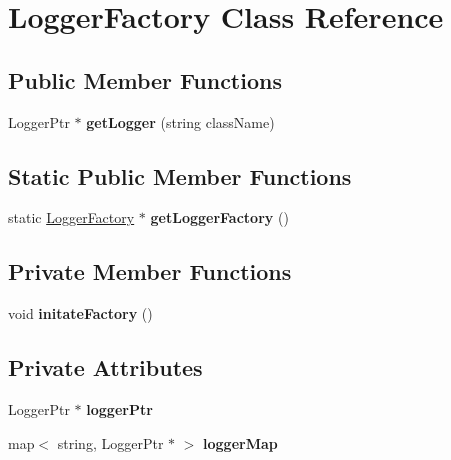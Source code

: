 \hypertarget{classLoggerFactory}{\section{\-Logger\-Factory \-Class \-Reference}
\label{classLoggerFactory}
}
\subsection*{\-Public \-Member \-Functions}
\begin{DoxyCompactItemize}
\item 
\hypertarget{classLoggerFactory_a579a14589f27a5bd908862c299e79251}{\-Logger\-Ptr $\ast$ {\bfseries get\-Logger} (string class\-Name)}\label{classLoggerFactory_a579a14589f27a5bd908862c299e79251}

\end{DoxyCompactItemize}
\subsection*{\-Static \-Public \-Member \-Functions}
\begin{DoxyCompactItemize}
\item 
\hypertarget{classLoggerFactory_ade202cd01c397ab938f71c5130cd4ae2}{static \hyperlink{classLoggerFactory}{\-Logger\-Factory} $\ast$ {\bfseries get\-Logger\-Factory} ()}\label{classLoggerFactory_ade202cd01c397ab938f71c5130cd4ae2}

\end{DoxyCompactItemize}
\subsection*{\-Private \-Member \-Functions}
\begin{DoxyCompactItemize}
\item 
\hypertarget{classLoggerFactory_a7e93424052b97739f87c602f9da6eb2a}{void {\bfseries initate\-Factory} ()}\label{classLoggerFactory_a7e93424052b97739f87c602f9da6eb2a}

\end{DoxyCompactItemize}
\subsection*{\-Private \-Attributes}
\begin{DoxyCompactItemize}
\item 
\hypertarget{classLoggerFactory_a68ba4fa6a4234af7ef84696997625acf}{\-Logger\-Ptr $\ast$ {\bfseries logger\-Ptr}}\label{classLoggerFactory_a68ba4fa6a4234af7ef84696997625acf}

\item 
\hypertarget{classLoggerFactory_ab66c78f99714d03b26bc129a88d26655}{map$<$ string, \-Logger\-Ptr $\ast$ $>$ {\bfseries logger\-Map}}\label{classLoggerFactory_ab66c78f99714d03b26bc129a88d26655}

\end{DoxyCompactItemize}
